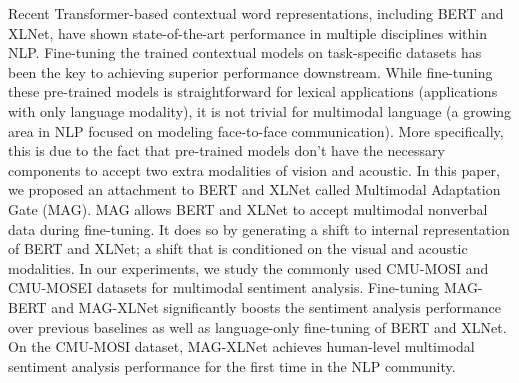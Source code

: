 Recent Transformer-based contextual word representations, including BERT and XLNet, have shown state-of-the-art performance in multiple disciplines within NLP. Fine-tuning the trained contextual models on task-specific datasets has been the key to achieving superior performance downstream. While fine-tuning these pre-trained models is straightforward for lexical applications (applications with only language modality), it is not trivial for multimodal language (a growing area in NLP focused on modeling face-to-face communication). More specifically, this is due to the fact that pre-trained models don't have the necessary components to accept two extra modalities of vision and acoustic. In this paper, we proposed an attachment to BERT and XLNet called Multimodal Adaptation Gate (MAG). MAG allows BERT and XLNet to accept multimodal nonverbal data during fine-tuning. It does so by generating a shift to internal representation of BERT and XLNet; a shift that is conditioned on the visual and acoustic modalities. In our experiments, we study the commonly used CMU-MOSI and CMU-MOSEI datasets for multimodal sentiment analysis. Fine-tuning MAG-BERT and MAG-XLNet significantly boosts the sentiment analysis performance over previous baselines as well as language-only fine-tuning of BERT and XLNet. On the CMU-MOSI dataset, MAG-XLNet achieves human-level multimodal sentiment analysis performance for the first time in the NLP community.
